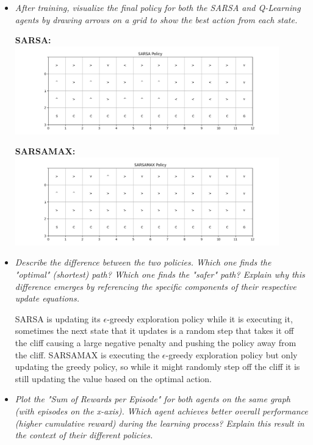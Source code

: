 \documentclass{article}
\begin{document}
\begin{itemize}
    \item \textit{After training, visualize the final policy for both the SARSA and Q-Learning agents by drawing arrows on a grid to show the best action from each state.}
    
    \vspace{1em}
    \noindent \textbf{SARSA:}\\
    \includegraphics[width=0.9\textwidth]{sarsaGrid.png}
    
    \vspace{1em}
    \noindent \textbf{SARSAMAX:}\\
    \includegraphics[width=0.9\textwidth]{sarsaMaxGrid.png}
    
    \item \textit{Describe the difference between the two policies. Which one finds the "optimal" (shortest) path? Which one finds the "safer" path? Explain why this difference emerges by referencing the specific components of their respective update equations.}
    
    SARSA is updating its $\epsilon$-greedy exploration policy while it is executing it, sometimes the next state that it updates is a random step that takes it off the cliff causing a large negative penalty and pushing the policy away from the cliff.  
    SARSAMAX is executing the $\epsilon$-greedy exploration policy but only updating the greedy policy, so while it might randomly step off the cliff it is still updating the value based on the optimal action.
    
    \item \textit{Plot the "Sum of Rewards per Episode" for both agents on the same graph (with episodes on the x-axis). Which agent achieves better overall performance (higher cumulative reward) during the learning process? Explain this result in the context of their different policies.}
    

\end{itemize}
\end{document}
